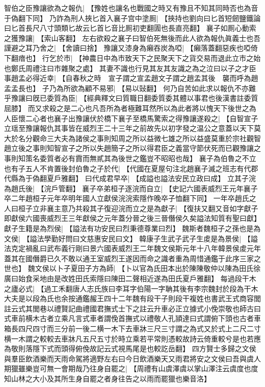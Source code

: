 智伯之臣豫讓欲為之報仇|{
	【豫姓也讓名也戰國之時又有豫且不知其同時否也為音于偽翻下同】}
乃詐為刑人挾匕首入襄子宫中塗厠|{
	【挾持也劉向曰匕首短劒鹽鐵論曰匕首長尺八寸頭類匕故云匕首匕音比厠初吏翻圊也長直亮翻】}
襄子如厠心動索之獲豫讓|{
	【索山客翻】}
左右欲殺之襄子曰智伯死無後而此人欲為報仇眞義士也吾謹避之耳乃舍之|{
	【舍讀曰捨】}
豫讓又漆身為癩吞炭為啞|{
	【癩落蓋翻惡疾也啞倚下翻瘖也】}
行乞於市|{
	【神農日中為市致天下之民聚天下之貨交易而退此立市之始也鄭氏周禮注曰市雜聚之處】}
其妻不識也行見其友其友識之為之泣曰以子之才臣事趙孟必得近幸|{
	【自春秋之時　宣子謂之宣孟趙文子謂之趙孟其後　襲而呼為趙孟孟長也】}
子乃為所欲為顧不易邪|{
	【易以䜴翻】}
何乃自苦如此求以報仇不亦難乎豫讓曰旣已委質為臣|{
	【經典釋文曰質職日翻委質委其體以事君也後漢書註委質屈膝】}
而又求殺之是二心也凡吾所為者極難耳然所以為此者將以愧天下後世之為人臣懷二心者也襄子出豫讓伏於橋下襄子至橋馬驚索之得豫讓遂殺之|{
	【自智宣子立瑶至豫讓報仇其事皆在威烈王二十三年之前故先以初字發之温公之意蓋以天下莫大於名分觀命三大夫為諸侯之事則知周之所以益微七雄之所以益盛莫重於宗社觀智趙立後之事則知智宣子之所以失趙簡子之所以得君臣之義當守節伏死而已觀豫讓之事則知策名委質者必有霣而無貳其為後世之鑑豈不昭昭也哉】}
襄子為伯魯之不立也有子五人不肯置後封伯魯之子於代|{
	【代國在夏屋句注北趙襄子滅之班志有代郡代縣為于偽翻夏戶雅翻】}
曰代成君早卒|{
	【成謚也謚法安民立政曰成】}
立其子浣為趙氏後|{
	【浣戶管翻】}
襄子卒弟桓子逐浣而自立|{
	【史記六國表威烈王元年襄子卒二年趙桓子元年卒明年國人立獻侯浣浣索隱作晚卒子恤翻下同】}
一年卒趙氏之人曰桓子立非襄主意乃共殺其子復迎浣而立之是為獻子|{
	【復扶又翻又音如字獻子即獻侯六國喪威烈王三年獻侯之元年蓋分晉之後三晉僭侯久矣謚法知質有聖曰獻】}
獻子生籍是為烈侯|{
	【謚法有功安民曰烈秉德尊業曰烈】}
魏斯者魏桓子之孫也是為文侯|{
	【謚法學勤好問曰文慈惠安民曰文】}
韓康子生武子武子生䖍是為景侯|{
	【謚法克定禍亂曰武布義行剛曰景六國表威烈王二年魏文侯斯元年十八年韓景侯䖍元年蓋其在國僭爵已久不敢以通王室威烈王遂因而命之識者重為周惜通鑑于此序三家之世也】}
魏文侯以卜子夏田子方為師|{
	【卜以官為氏田本出於陳陳敬仲以陳為田氏徐廣曰始食采地由是改姓田氏索隱曰陳田二聲相近遂為田氏夏戶雅翻】}
每過段干木之廬必式|{
	【過工禾翻唐人志氏族曰李耳字伯陽一字聃其後有李宗魏封於段為干木大夫是以段為氏也余按通鑑赧王四十二年魏有段干子則段干複姓也書武王式商容閭註云式其閭巷以禮賢記曲禮國君撫式士下之註云升車必正立據式小俛崇敬也師古曰式車前横木古者立乘凡言式車者謂俛首撫式以禮敬人孔頴達曰式謂俯下頭也古者車箱長四尺四寸而三分前一後二横一木下去車牀三尺三寸謂之為式又於式上二尺二寸横一木謂之較較去車牀凡五尺五寸於時立乘若平常則憑較故詩云倚重較兮是也若應為敬則落隱下式而頭得俯俛故記云式視馬尾是也較訖岳翻】}
四方賢士多歸之文侯與羣臣飲酒樂而天雨命駕將適野左右曰今日飲酒樂天又雨君將安之文侯曰吾與虞人期獵雖樂豈可無一會期哉乃往身自罷之|{
	【周禮有山虞澤虞以掌山澤注云虞度也度知山林之大小及其所生身自罷之者身往告之以雨而罷獵也樂音洛】}
